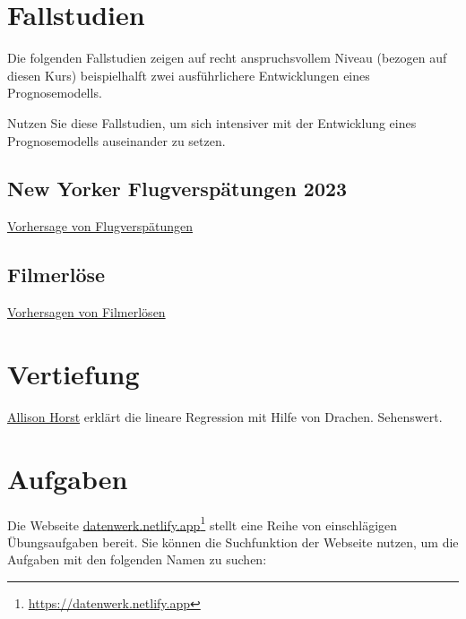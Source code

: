 \documentclass[
  letterpaper,
]{scrbook}
\theoremstyle{definition}
\theoremstyle{definition}
\theoremstyle{definition}
\theoremstyle{remark}
\begin{document}
\section{Fallstudien}\label{fallstudien-2}

Die folgenden Fallstudien zeigen auf recht anspruchsvollem Niveau
(bezogen auf diesen Kurs) beispielhalft zwei ausführlichere
Entwicklungen eines Prognosemodells.

Nutzen Sie diese Fallstudien, um sich intensiver mit der Entwicklung
eines Prognosemodells auseinander zu setzen.

\subsection{New Yorker Flugverspätungen
2023}\label{new-yorker-flugverspuxe4tungen-2023}

\href{https://datenwerk.netlify.app/posts/flights-delay-simplified//}{Vorhersage
von Flugverspätungen}

\subsection{Filmerlöse}\label{filmerluxf6se}

\href{https://data-se.netlify.app/2020/11/13/fallstudie-zur-regressionsanalyse-ggplot2movies/}{Vorhersagen
von Filmerlösen}

\section{Vertiefung}\label{vertiefung-7}

\href{https://allisonhorst.com/linear-regression-dragons}{Allison Horst}
erklärt die lineare Regression mit Hilfe von Drachen. Sehenswert.

\section{Aufgaben}\label{aufgaben-8}

Die Webseite
\href{https://datenwerk.netlify.app}{datenwerk.netlify.app}\footnote{\url{https://datenwerk.netlify.app}}
stellt eine Reihe von einschlägigen Übungsaufgaben bereit. Sie können
die Suchfunktion der Webseite nutzen, um die Aufgaben mit den folgenden
Namen zu suchen:
\end{document}
